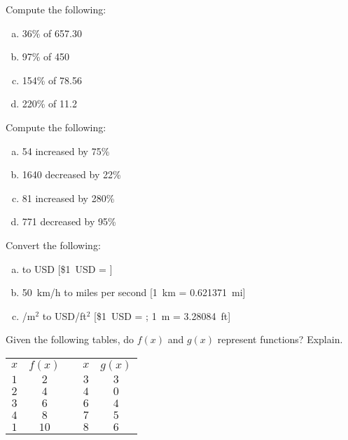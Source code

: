 \documentclass[11pt,letterpaper]{article}
\begin{document}

 Compute the following:
        \begin{enumerate}[(a)]
        \item 36\% of 657.30
        \item 97\% of 450
        \item 154\% of 78.56
        \item 220\% of 11.2
        \end{enumerate}



\newpage



 Compute the following:
        \begin{enumerate}[(a)]
        \item 54 increased by 75\%
        \item 1640 decreased by 22\%
        \item 81 increased by 280\%
        \item 771 decreased by 95\%
        \end{enumerate}



\newpage



 Convert the following:
	\begin{enumerate}[(a)]
	\item {} to USD [\$1~USD = ]
	\item 50~km/h to miles per second [1~km = 0.621371~mi]
	\item {}/m$^2$ to USD/ft$^2$ [\$1~USD = ; 1~m = 3.28084~ft]
	\end{enumerate}



\newpage



 Given the following tables, do $f(x)$ and $g(x)$ represent functions? Explain. 
	\begin{table}[!ht]
	\centering \setlength\arrayrulewidth{0.02cm}
	\begin{tabular}{c|ccc|c} 
	$x$ & $f(x)$ & \hspace{2cm} & $x$ & $g(x)$ \\ \cline{1-2} \cline{4-5}
	$1$ & $2$ && $3$ & $3$ \\
	$2$ & $4$ && $4$ & $0$ \\
	$3$ & $6$ && $6$ & $4$ \\
	$4$ & $8$ && $7$ & $5$ \\
	$1$ & $10$ && $8$ & $6$  
	\end{tabular}
	\end{table}
\end{document}
